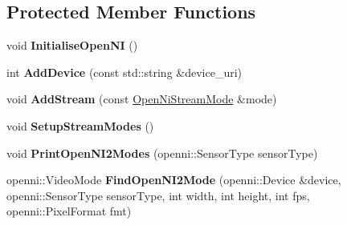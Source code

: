 \subsection*{Protected Member Functions}
\begin{DoxyCompactItemize}
\item 
void {\bfseries Initialise\+Open\+NI} ()\hypertarget{structpangolin_1_1_open_ni_video2_a337acc14504a05184102a6f2147056e8}{}\label{structpangolin_1_1_open_ni_video2_a337acc14504a05184102a6f2147056e8}

\item 
int {\bfseries Add\+Device} (const std\+::string \&device\+\_\+uri)\hypertarget{structpangolin_1_1_open_ni_video2_a38c259b039428f1ce731530c26ed7881}{}\label{structpangolin_1_1_open_ni_video2_a38c259b039428f1ce731530c26ed7881}

\item 
void {\bfseries Add\+Stream} (const \hyperlink{structpangolin_1_1_open_ni_stream_mode}{Open\+Ni\+Stream\+Mode} \&mode)\hypertarget{structpangolin_1_1_open_ni_video2_a6f66deacc496313dbdf3d955dea72926}{}\label{structpangolin_1_1_open_ni_video2_a6f66deacc496313dbdf3d955dea72926}

\item 
void {\bfseries Setup\+Stream\+Modes} ()\hypertarget{structpangolin_1_1_open_ni_video2_a193e783e16265b14ddc71efb2297a201}{}\label{structpangolin_1_1_open_ni_video2_a193e783e16265b14ddc71efb2297a201}

\item 
void {\bfseries Print\+Open\+N\+I2\+Modes} (openni\+::\+Sensor\+Type sensor\+Type)\hypertarget{structpangolin_1_1_open_ni_video2_aaa42b62c37ec2ecd7d0cf3d05f579547}{}\label{structpangolin_1_1_open_ni_video2_aaa42b62c37ec2ecd7d0cf3d05f579547}

\item 
openni\+::\+Video\+Mode {\bfseries Find\+Open\+N\+I2\+Mode} (openni\+::\+Device \&device, openni\+::\+Sensor\+Type sensor\+Type, int width, int height, int fps, openni\+::\+Pixel\+Format fmt)\hypertarget{structpangolin_1_1_open_ni_video2_a57eabf23de55db37748c2050c09a21f7}{}\label{structpangolin_1_1_open_ni_video2_a57eabf23de55db37748c2050c09a21f7}

\end{DoxyCompactItemize}
